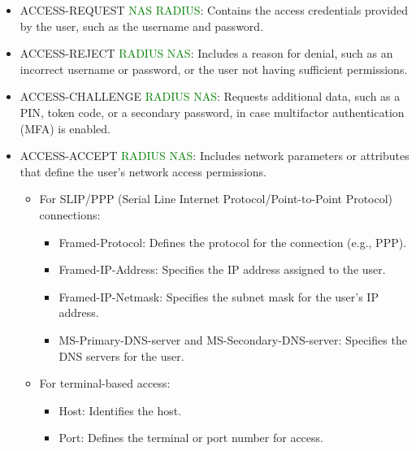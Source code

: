 \begin{itemize}
    \item ACCESS-REQUEST \textcolor{Green}{NAS \textrightarrow RADIUS}: Contains the access credentials provided by the user, such as the username and password.
    \item ACCESS-REJECT \textcolor{green}{RADIUS \textrightarrow NAS}: Includes a reason for denial, such as an incorrect username or password, or the user not having sufficient permissions.
    \item ACCESS-CHALLENGE \textcolor{green}{RADIUS \textrightarrow NAS}: Requests additional data, such as a PIN, token code, or a secondary password, in case multifactor authentication (MFA) is enabled.
    \item ACCESS-ACCEPT \textcolor{green}{RADIUS \textrightarrow NAS}: Includes network parameters or attributes that define the user’s network access permissions.
    \begin{itemize}
        \item For SLIP/PPP (Serial Line Internet Protocol/Point-to-Point Protocol) connections:
        \begin{itemize}
            \item Framed-Protocol: Defines the protocol for the connection (e.g., PPP).
            \item Framed-IP-Address: Specifies the IP address assigned to the user.
            \item Framed-IP-Netmask: Specifies the subnet mask for the user’s IP address.
            \item MS-Primary-DNS-server and MS-Secondary-DNS-server: Specifies the DNS servers for the user.
        \end{itemize}
        \item For terminal-based access:
        \begin{itemize}
            \item Host: Identifies the host.
            \item Port: Defines the terminal or port number for access.
        \end{itemize}
    \end{itemize}
\end{itemize}

